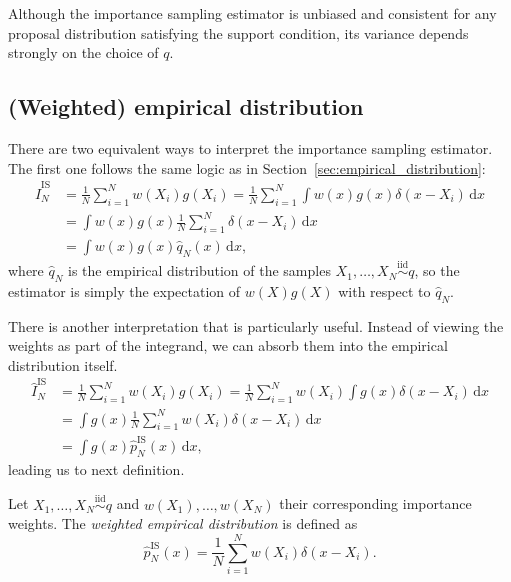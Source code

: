 Although the importance sampling estimator is unbiased and consistent for any proposal distribution satisfying the support condition, its variance depends strongly on the choice of $q$.

\subsection{(Weighted) empirical distribution}
\label{sec:weighted_empirical_distribution}

There are two equivalent ways to interpret the importance sampling estimator.
The first one follows the same logic as in Section~\ref{sec:empirical_distribution}:
\begin{align}
    \hat{I}_N^{\mathrm{IS}} &= \frac{1}{N}\sum_{i=1}^{N}w(X_i)g(X_i) = \frac{1}{N}\sum_{i=1}^{N} \int w(x)g(x) \delta(x-X_i)\,\mathrm{d}x \\
    &=\int w(x)g(x) \frac{1}{N}\sum_{i=1}^{N}\delta(x-X_i)\,\mathrm{d}x \\
    &=\int w(x)g(x) \hat{q}_N(x)\,\mathrm{d}x,
\end{align}
where $\hat{q}_N$ is the empirical distribution of the samples $X_1,\ldots,X_N\overset{\mathrm{iid}}{\sim}q$, so the estimator is simply the expectation of $w(X)g(X)$ with respect to $\hat{q}_N$.

There is another interpretation that is particularly useful. Instead of viewing the weights as part of the integrand, we can absorb them into the empirical distribution itself.
\begin{align}
    \hat{I}_N^{\mathrm{IS}} &= \frac{1}{N}\sum_{i=1}^{N}w(X_i)g(X_i) = \frac{1}{N}\sum_{i=1}^{N} w(X_i) \int g(x) \delta(x-X_i)\,\mathrm{d}x \\
    &=\int g(x) \frac{1}{N}\sum_{i=1}^{N}w(X_i)\delta(x-X_i)\,\mathrm{d}x \\
    &=\int g(x) \hat{p}_N^{\mathrm{IS}}(x)\,\mathrm{d}x,
\end{align}
leading us to next definition.
\begin{definition}
Let $X_1,\ldots,X_N \overset{\mathrm{iid}}{\sim} q$ and $w(X_1),\ldots,w(X_N)$ their corresponding importance weights. 
The \emph{weighted empirical distribution} is defined as
\begin{equation}
    \hat{p}_N^{\mathrm{IS}}(x) = \frac{1}{N} \sum_{i=1}^N w(X_i)\delta(x-X_i).
    \label{eq:weighted_empirical_distribution}
\end{equation}
\end{definition}

